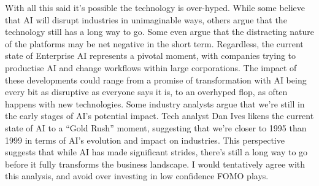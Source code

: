 With all this said it's possible the technology is over-hyped. While some believe that AI will disrupt industries in unimaginable ways, others argue that the technology still has a long way to go. Some even argue that the distracting nature of the platforms may be net negative in the short term. Regardless, the current state of Enterprise AI represents a pivotal moment, with companies trying to productise AI and change workflows within large corporations. The impact of these developments could range from a promise of transformation with AI being every bit as disruptive as everyone says it is, to an overhyped flop, as often happens with new technologies. Some industry analysts argue that we're still in the early stages of AI's potential impact. Tech analyst Dan Ives likens the current state of AI to a ``Gold Rush'' moment, suggesting that we're closer to 1995 than 1999 in terms of AI's evolution and impact on industries. This perspective suggests that while AI has made significant strides, there's still a long way to go before it fully transforms the business landscape. I would tentatively agree with this analysis, and avoid over investing in low confidence FOMO plays.
